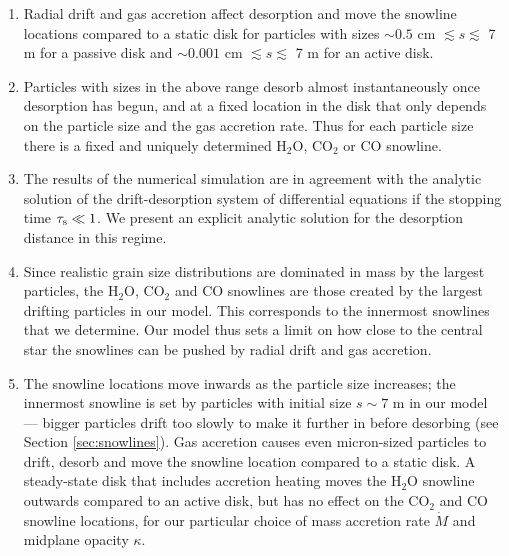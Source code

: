 \documentclass[apj]{emulateapj}
\begin{document}
\begin{enumerate}
\item Radial drift and gas accretion affect desorption and move the snowline locations compared to a static disk for particles with sizes $\sim$$0.5$ cm $\lesssim s \lesssim$ 7 m for a passive disk and $\sim$$0.001$ cm $\lesssim s \lesssim$ 7 m for an active disk. %

\item Particles with sizes in the above range desorb almost instantaneously once desorption has begun, and at a fixed location in the disk that only depends on the particle size and the gas accretion rate. Thus for each particle size there is a fixed and uniquely determined H$_2$O, CO$_2$ or CO snowline. 

\item The results of the numerical simulation are in agreement with the analytic solution of the drift-desorption system of differential equations if the stopping time $\tau_{\rm s} \ll 1$. We present an explicit analytic solution for the desorption distance in this regime.  



\item Since realistic grain size distributions are dominated in mass by the largest particles, the H$_2$O, CO$_2$ and CO snowlines are those created by the largest drifting particles in our model. This corresponds to the innermost snowlines that we determine. Our model thus sets a limit on how close to the central star the snowlines can be pushed by radial drift and gas accretion.

\item The snowline locations move inwards as the particle size increases; the innermost snowline is set by particles with initial size $s \sim 7$ m in our model --- bigger particles drift too slowly to make it further in before desorbing (see Section \ref{sec:snowlines}). Gas accretion causes even micron-sized particles to drift, desorb and move the snowline location compared to a static disk. A steady-state disk that includes accretion heating moves the H$_2$O snowline outwards compared to an active disk, but has no effect on the CO$_2$ and CO snowline locations, for our particular choice of mass accretion rate $\dot{M}$ and midplane opacity $\kappa$. %


\end{enumerate}
\end{document}
